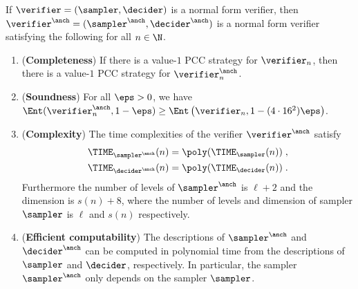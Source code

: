 \begin{proposition}
  \label{prop:anchoring}
  If $\verifier = (\sampler, \decider)$ is a normal form verifier, then 
$\vanch = (\sanch,\danch)$ is a normal form verifier satisfying the following
   for all $n \in \N$.  
\begin{enumerate}
  \item \label{enu:anch-completeness} (\textbf{Completeness}) If there is a
    value-$1$ PCC strategy for $\verifier_n$, then there is a value-$1$ PCC
    strategy for $\vanch_n$.
  \item \label{enu:anch-soundness} (\textbf{Soundness}) For all $\eps > 0$, we have $\Ent(\vanch_n,1 - \eps) \geq \Ent \left (\verifier_n, 1 - (4
        \cdot 16^2) \eps \right)$.
\item \label{enu:anch-complexity} (\textbf{Complexity}) The
    time complexities of the verifier $\vanch$ satisfy
    \begin{align*}
      \TIME_{\sanch}(n) & = \poly(\TIME_\sampler(n))\;,\\
      \TIME_{\danch}(n) & = \poly(\TIME_\decider(n))\;.
    \end{align*}
    Furthermore the number of levels of $\sanch$ is $\ell + 2$ and the dimension is $s(n)+8$, where the number of levels and dimension of sampler $\sampler$ is $\ell$ and $s(n)$ respectively.
  \item \label{enu:anch-efficient-computability} (\textbf{Efficient
      computability}) The descriptions of $\sanch$ and $\danch$
    can be computed in polynomial time from the descriptions of $\sampler$ and
    $\decider$, respectively.
    In particular, the sampler $\sanch$ only depends on the sampler
    $\sampler$.
  \end{enumerate}
\end{proposition}

